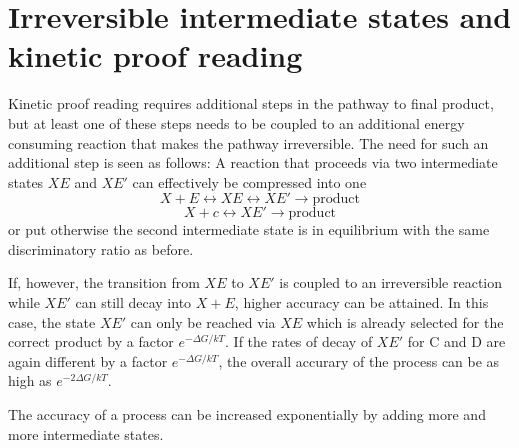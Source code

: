\section{Irreversible intermediate states and kinetic proof reading}
Kinetic proof reading requires additional steps in the pathway to final product, but at least one of these steps needs to be coupled to an additional energy consuming reaction that makes the pathway irreversible.
The need for such an additional step is seen as follows: A reaction that proceeds via two intermediate states $XE$ and $XE'$ can effectively be compressed into one
\begin{equation}
X + E \leftrightarrow XE \leftrightarrow  XE' \rightarrow \mathrm{product}
\end{equation}
\begin{equation}
X + c \leftrightarrow  XE' \rightarrow \mathrm{product}
\end{equation}
or put otherwise the second intermediate state is in equilibrium with the same discriminatory ratio as before.

If, however, the transition from $XE$ to $XE' $ is coupled to an irreversible reaction while $XE'$ can still decay into $X+E$, higher accuracy can be attained.
In this case, the state $XE'$ can only be reached via $XE$ which is already selected for the correct product by a factor $e^{-\Delta G/kT}$.
If the rates of decay of $XE'$ for C and D are again different by a factor $e^{-\Delta G/kT}$, the overall accurary of the process can be as high as $e^{-2\Delta G/kT}$.

The accuracy of a process can be increased exponentially by adding more and more intermediate states.

